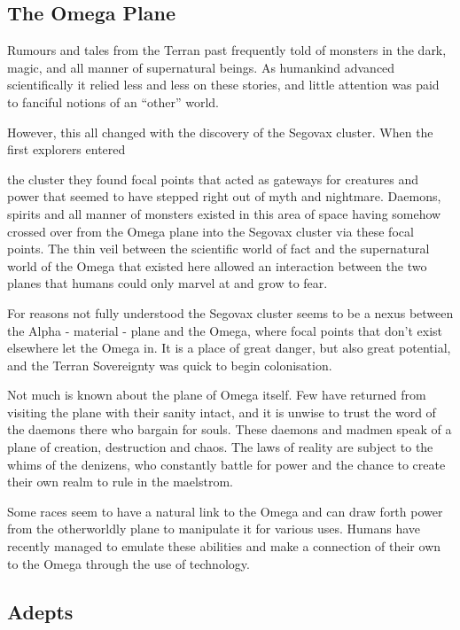 \documentclass{scrbook}
\begin{document}
\subsection{The Omega Plane}

Rumours and tales from the Terran past frequently told of monsters in the dark, magic, and all manner of supernatural beings. As humankind advanced scientifically it relied less and less on these stories, and little attention was paid to fanciful notions of an ``other'' world.

However, this all changed with the discovery of the Segovax cluster. When the first explorers entered

the cluster they found focal points that acted as gateways for creatures and power that seemed to have stepped right out of myth and nightmare. Daemons, spirits and all manner of monsters existed in this area of space having somehow crossed over from the Omega plane into the Segovax cluster via these focal points. The thin veil between the scientific world of fact and the supernatural world of the Omega that existed here allowed an interaction between the two planes that humans could only marvel at and grow to fear.

For reasons not fully understood the Segovax cluster seems to be a nexus between the Alpha - material - plane and the Omega, where focal points that don't exist elsewhere let the Omega in. It is a place of great danger, but also great potential, and the Terran Sovereignty was quick to begin colonisation.

Not much is known about the plane of Omega itself. Few have returned from visiting the plane with their sanity intact, and it is unwise to trust the word of the daemons there who bargain for souls. These daemons and madmen speak of a plane of creation, destruction and chaos. The laws of reality are subject to the whims of the denizens, who constantly battle for power and the chance to create their own realm to rule in the maelstrom.

Some races seem to have a natural link to the Omega and can draw forth power from the otherworldly plane to manipulate it for various uses. Humans have recently managed to emulate these abilities and make a connection of their own to the Omega through the use of technology.

\subsection{Adepts}
\end{document}
